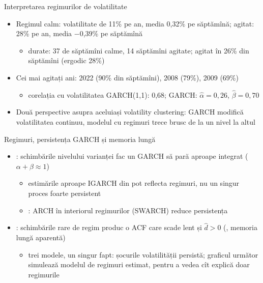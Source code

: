 \begin{frame}{Interpretarea regimurilor de volatilitate}
\itemsize{\small}
\begin{itemize}
    \item Regimul calm: volatilitate de 11\% pe an, media 0{,}32\% pe săptămînă; agitat: 28\% pe an, media \ensuremath{-}0{,}39\% pe săptămînă
    \begin{itemize}
        \item durate: 37 de săptămîni calme, 14 săptămîni agitate; agitat în 26\% din săptămîni (ergodic 28\%)
    \end{itemize}
    \item Cei mai agitați ani: 2022 (90\% din săptămîni), 2008 (79\%), 2009 (69\%)
    \begin{itemize}
        \item corelația cu volatilitatea GARCH(1,1): 0{,}68; GARCH: $\hat\alpha = 0{,}26$, $\hat\beta = 0{,}70$
    \end{itemize}
    \item Două perspective asupra aceluiași volatility clustering: GARCH modifică volatilitatea continuu, modelul cu regimuri trece brusc de la un nivel la altul
\end{itemize}
\end{frame}

\begin{frame}{Regimuri, persistența GARCH și memoria lungă}
\itemsize{\small}
\begin{itemize}
    \item {}: schimbările nivelului varianței fac un GARCH să pară aproape integrat ($\alpha + \beta \approx 1$)
    \begin{itemize}
        \item estimările aproape IGARCH din  pot reflecta regimuri, nu un singur proces foarte persistent
        \item {}: ARCH în interiorul regimurilor (SWARCH) reduce persistența
    \end{itemize}
    \item {}: schimbările rare de regim produc o ACF care scade lent și $\hat d > 0$ (, memoria lungă aparentă)
    \begin{itemize}
        \item trei modele, un singur fapt: șocurile volatilității persistă; graficul următor simulează modelul de regimuri estimat, pentru a vedea cît explică doar regimurile
    \end{itemize}
\end{itemize}
\end{frame}

